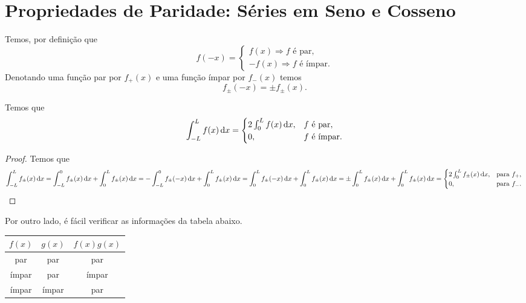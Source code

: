 \section{Propriedades de Paridade: Séries em Seno e Cosseno}
Temos, por definição que
\begin{dmath*}
  f(-x) = \begin{cases}
    f(x) \Rightarrow f \text{ é par}, \\
    -f(x) \Rightarrow f \text{ é ímpar}.
  \end{cases}
\end{dmath*}
Denotando uma função par por $f_+(x)$ e uma função ímpar por $f_-(x)$ temos
\begin{dmath*}
  f_\pm(-x) = \pm f_\pm(x).
\end{dmath*}

\begin{prop}
  Temos que
  \begin{dmath*}
    \int_{-L}^L f(x) \vi{x} = \begin{cases}
      2 \int_0^L f(x) \vi{x}, & f \text{ é par}, \\
      0, & f \text{ é ímpar}.
    \end{cases}
  \end{dmath*}
\end{prop}
\begin{proof}
  Temos que
  \begin{dmath*}
    \int_{-L}^L f_\pm(x) \vi{x} = \int_{-L}^0 f_\pm(x) \vi{x} + \int_0^L f_\pm(x) \vi{x}
    = -\int_{-L}^0 f_\pm(-x) \vi{x} + \int_0^L f_\pm(x) \vi{x}
    = \int_0^L f_\pm(-x) \vi{x} + \int_0^L f_\pm(x) \vi{x}
    = \pm \int_0^L f_\pm(x) \vi{x} + \int_0^L f_\pm(x) \vi{x}
    = \begin{cases}
      2 \int_0^L f_\pm(x) \vi{x}, & \text{para } f_+, \\
      0, & \text{para } f_-.
    \end{cases} \qedhere
  \end{dmath*}
\end{proof}

Por outro lado, é fácil verificar as informações da tabela abaixo.
\begin{table}[htb]
  \centering
  \begin{tabular}{|c|c|c|}
    \hline
    $f(x)$ & $g(x)$ & $f(x) g(x)$ \\ \hline
    par & par & par \\ \hline
    ímpar & par & ímpar \\ \hline
    ímpar & ímpar & par \\ \hline
  \end{tabular}
\end{table}

